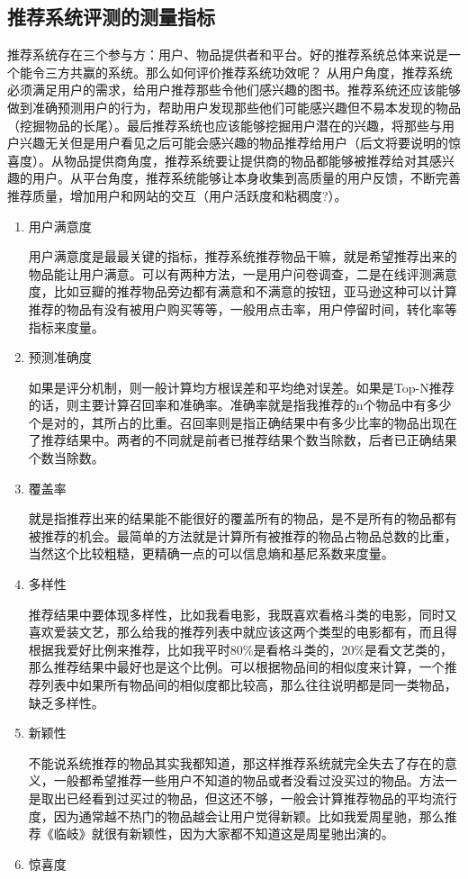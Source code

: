 		\subsection{推荐系统评测的测量指标}
		推荐系统存在三个参与方：用户、物品提供者和平台。好的推荐系统总体来说是一个能令三方共赢的系统。那么如何评价推荐系统功效呢？ 从用户角度，推荐系统必须满足用户的需求，给用户推荐那些令他们感兴趣的图书。推荐系统还应该能够做到准确预测用户的行为，帮助用户发现那些他们可能感兴趣但不易本发现的物品（挖掘物品的长尾）。最后推荐系统也应该能够挖掘用户潜在的兴趣，将那些与用户兴趣无关但是用户看见之后可能会感兴趣的物品推荐给用户（后文将要说明的惊喜度）。从物品提供商角度，推荐系统要让提供商的物品都能够被推荐给对其感兴趣的用户。从平台角度，推荐系统能够让本身收集到高质量的用户反馈，不断完善推荐质量，增加用户和网站的交互（用户活跃度和粘稠度?）。
			\begin{enumerate}[(1)]
			\item 用户满意度

			用户满意度是最最关键的指标，推荐系统推荐物品干嘛，就是希望推荐出来的物品能让用户满意。可以有两种方法，一是用户问卷调查，二是在线评测满意度，比如豆瓣的推荐物品旁边都有满意和不满意的按钮，亚马逊这种可以计算推荐的物品有没有被用户购买等等，一般用点击率，用户停留时间，转化率等指标来度量。
			\item 预测准确度

			如果是评分机制，则一般计算均方根误差和平均绝对误差。如果是Top-N推荐的话，则主要计算召回率和准确率。准确率就是指我推荐的n个物品中有多少个是对的，其所占的比重。召回率则是指正确结果中有多少比率的物品出现在了推荐结果中。两者的不同就是前者已推荐结果个数当除数，后者已正确结果个数当除数。
			\item 覆盖率

			就是指推荐出来的结果能不能很好的覆盖所有的物品，是不是所有的物品都有被推荐的机会。最简单的方法就是计算所有被推荐的物品占物品总数的比重，当然这个比较粗糙，更精确一点的可以信息熵和基尼系数来度量。
			\item 多样性

			推荐结果中要体现多样性，比如我看电影，我既喜欢看格斗类的电影，同时又喜欢爱装文艺，那么给我的推荐列表中就应该这两个类型的电影都有，而且得根据我爱好比例来推荐，比如我平时80\%是看格斗类的，20\%是看文艺类的，那么推荐结果中最好也是这个比例。可以根据物品间的相似度来计算，一个推荐列表中如果所有物品间的相似度都比较高，那么往往说明都是同一类物品，缺乏多样性。
			\item 新颖性

			不能说系统推荐的物品其实我都知道，那这样推荐系统就完全失去了存在的意义，一般都希望推荐一些用户不知道的物品或者没看过没买过的物品。方法一是取出已经看到过买过的物品，但这还不够，一般会计算推荐物品的平均流行度，因为通常越不热门的物品越会让用户觉得新颖。比如我爱周星驰，那么推荐《临岐》就很有新颖性，因为大家都不知道这是周星驰出演的。
			\item 惊喜度


\end{enumerate}
